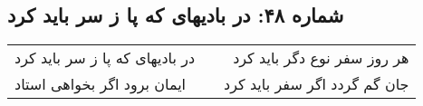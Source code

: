 \begin{center}
\section*{شماره ۴۸: در بادیهای که پا ز سر باید کرد}
\label{sec:048}
\begin{longtable}{l p{0.5cm} r}
در بادیهای که پا ز سر باید کرد
&&
هر روز سفر نوع دگر باید کرد
\\
ایمان برود اگر بخواهی استاد
&&
جان گم گردد اگر سفر باید کرد
\\
\end{longtable}
\end{center}
